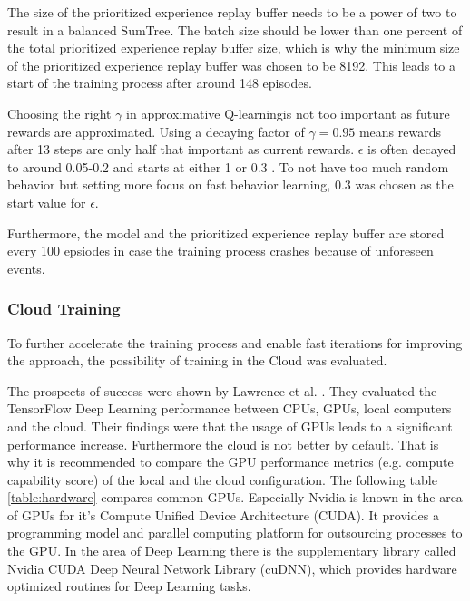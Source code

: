 The size of the prioritized experience replay buffer needs to be a power of two to result in a balanced SumTree. The batch size should be lower than one percent of the total prioritized experience replay buffer size, which is why the minimum size of the prioritized experience replay buffer was chosen to be 8192. This leads to a start of the training process after around 148 episodes. 

Choosing the right $\gamma$ in approximative Q-learningis not too important as future rewards are approximated. Using a decaying factor of $\gamma=0.95$ means rewards after 13 steps are only half that important as current rewards. $\epsilon$ is often decayed to around 0.05-0.2 and starts at either 1 or 0.3 \cite{Hessel2017, Kormelink2018, Franca2019}. To not have too much random behavior but setting more focus on fast behavior learning, 0.3 was chosen as the start value for $\epsilon$. 

Furthermore, the model and the  prioritized experience replay buffer are stored every 100 epsiodes in case the training process crashes because of unforeseen events. 

\subsubsection{Cloud Training}
\label{ch:approachBf}

To further accelerate the training process and enable fast iterations for im\-pro\-ving the approach, the possibility of training in the Cloud was evaluated. 

The prospects of success were shown by Lawrence et al. \cite{Lawrence2017ComparingTD}. They evaluated the TensorFlow Deep Learning performance between CPUs, GPUs, local computers and the cloud. Their findings were that the usage of GPUs leads to a significant performance increase. Furthermore the cloud is not better by default. That is why it is recommended to compare the GPU performance metrics (e.g. compute capability score) of the local and the cloud configuration. The following table \ref{table:hardware} compares common GPUs.
Especially Nvidia is known in the area of GPUs for it's Compute Unified Device Ar\-chi\-tec\-tu\-re (CUDA). It provides a programming model and parallel computing platform for outsourcing processes to the GPU. In the area of Deep Learning there is the supplementary library called Nvidia CUDA Deep Neural Network Library (cuDNN), which provides hardware optimized routines for Deep Learning tasks.

